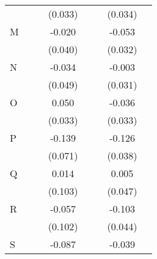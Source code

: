 \begin{longtable}{l*{3}{c}|l*{3}{c}}
	&                     &                     &     (0.033)         &                     &                     &     (0.034)         \\
	M                   &                     &                     &      -0.020         &                     &                     &      -0.053\sym{*}  \\
	&                     &                     &     (0.040)         &                     &                     &     (0.032)         \\
	N                   &                     &                     &      -0.034         &                     &                     &      -0.003         \\
	&                     &                     &     (0.049)         &                     &                     &     (0.031)         \\
	O                   &                     &                     &       0.050         &                     &                     &      -0.036         \\
	&                     &                     &     (0.033)         &                     &                     &     (0.033)         \\
	P                   &                     &                     &      -0.139\sym{**} &                     &                     &      -0.126\sym{***}\\
	&                     &                     &     (0.071)         &                     &                     &     (0.038)         \\
	Q                   &                     &                     &       0.014         &                     &                     &       0.005         \\
	&                     &                     &     (0.103)         &                     &                     &     (0.047)         \\
	R                   &                     &                     &      -0.057         &                     &                     &      -0.103\sym{**} \\
	&                     &                     &     (0.102)         &                     &                     &     (0.044)         \\
	S                   &                     &                     &      -0.087         &                     &                     &      -0.039         \\

\end{longtable}
